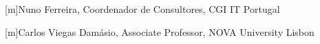 

[m]{{Nuno Ferreira, Coordenador de Consultores, CGI IT Portugal}}


[m]{{Carlos Viegas Damásio, Associate Professor, NOVA University Lisbon}}


